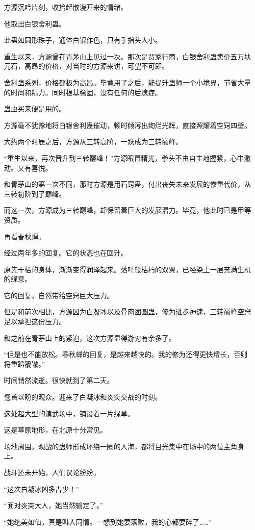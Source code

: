 \begin{this_body}
方源沉吟片刻，收拾起散漫开来的情绪。

他取出白银舍利蛊。

此蛊如圆形珠子，通体白银作色，只有手指头大小。

重生以来，方源曾在青茅山上见过一次。那次是贾家行商，白银舍利蛊卖价五万块元石，高昂的价格，对当时的方源来讲，可望不可即。

舍利蛊系列，价格都极为高昂。毕竟用了之后，能提升蛊师一个小境界，节省大量的时间和精力。同时根基稳固，没有任何的后遗症。

蛊虫买来便是用的。

方源毫不犹豫地将白银舍利蛊催动，顿时倾泻出绚烂光辉，直接照耀着空窍四壁。

大约两个时辰之后，方源从三转高阶，一跃成为三转巅峰。

“重生以来，再次晋升到三转巅峰！”方源眼冒精光，拳头不由自主地握紧，心中激动。又有喜悦。

和青茅山的第一次不同，那时方源是用石窍蛊，付出丧失未来发展的惨重代价，从三转初阶到了巅峰。

而这一次，方源成为三转巅峰，却保留着巨大的发展潜力。毕竟，他此时已是甲等资质。

再看春秋蝉。

经过两年多的回复。它的状态也在回升。

原先干枯的身体，渐渐变得润泽起来。落叶般枯朽的双翼，已经染上一层充满生机的绿意。

它的回复。自然带给空窍巨大压力。

但是和前次相比，方源因为白凝冰以及骨肉团圆蛊，修为进步神速，三转巅峰空窍足以承担这份压力。

和之前在青茅山上的紧迫，这次方源显得游刃有余多了。

“但是也不能放松。春秋蝉的回复，是越来越快的。我的修为还得更快增长，否则将重蹈覆辙。”

时间悄然流逝。很快就到了第二天。

翘首以盼的观众。迎来了白凝冰和炎突交战的时刻。

这处超大型的演武场中，铺设着一片绿草。

这是草原地形，在北原十分常见。

场地周围。观战的蛊师形成环绕一圈的人海，都将目光集中在场中的两位主角身上。

战斗还未开始，人们议论纷纷。

“这次白凝冰凶多吉少！”

“面对炎突大人，她当然输定了。”

“她绝美如仙，真是叫人同情。一想到她要落败，我的心都要碎了……”


\end{this_body}
